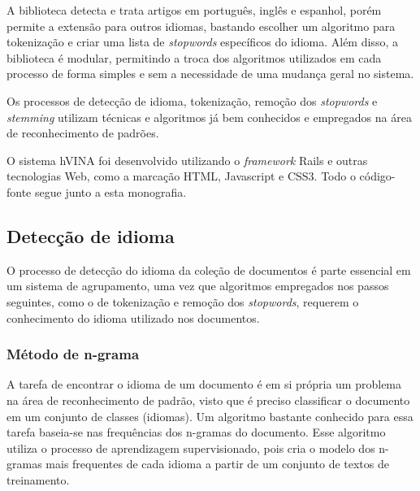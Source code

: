 \documentclass[a4paper,12pt]{article}
\begin{document}
A biblioteca detecta e trata artigos em português, inglês e espanhol, porém permite a extensão para outros idiomas, bastando escolher um algoritmo para tokenização e criar uma lista de \textit{stopwords} específicos do idioma. Além disso, a biblioteca é modular, permitindo a troca dos algoritmos utilizados em cada processo de forma simples e sem a necessidade de uma mudança geral no sistema.

Os processos de detecção de idioma, tokenização, remoção dos \textit{stopwords} e \textit{stemming} utilizam técnicas e algoritmos já bem conhecidos e empregados na área de reconhecimento de padrões. 

O sistema hVINA foi desenvolvido utilizando o \textit{framework} Rails \cite{rails} e outras tecnologias Web, como a marcação HTML, Javascript e CSS3. Todo o código-fonte segue junto a esta monografia.

\subsection {Detecção de idioma}
\label {sec:deteccao_idioma}

O processo de detecção do idioma da coleção de documentos é parte essencial em um sistema de agrupamento, uma vez que algoritmos empregados nos passos seguintes, como o de tokenização e remoção dos \textit{stopwords}, requerem o conhecimento do idioma utilizado nos documentos.

\subsubsection {Método de n-grama}
\label {sec:metodo_ n_grama}

A tarefa de encontrar o idioma de um documento é em si própria um problema na área de reconhecimento de padrão, visto que é preciso classificar o documento em um conjunto de classes (idiomas). Um algoritmo bastante conhecido para essa tarefa baseia-se nas frequências dos n-gramas do documento. Esse algoritmo utiliza o processo de aprendizagem supervisionado, pois cria o modelo dos n-gramas mais frequentes de cada idioma a partir de um conjunto de textos de treinamento.
\end{document}
